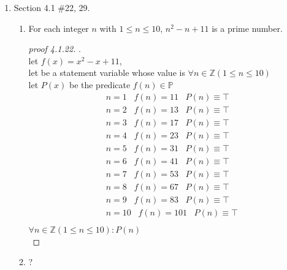 \documentclass[12pt]{article}
\newcommand{\T}[0]{\top}
\newcommand{\Z}{\mathbb{Z}}
\newcommand{\paren}[1]{\left( #1 \right)}
\begin{document}
\begin{enumerate}
        \item Section 4.1 \#22, 29.
            \begin{enumerate}
                \item[22.] For each integer $n$ with $1\leq n \leq 10$, $n^2 - n + 11$ is a prime number. 
                \begin{proof}[proof 4.1.22].\\
                    let $f(x) = x^2 - x + 11 $, \\
                    let be a statement variable whose value is $\forall n \in \Z \paren{1\leq n \leq 10}$\\
                    let $P(x)$ be the predicate $f(n) \in \mathbb{P}$\\
                    \begin{align*}
                        &n = 1\;\;\; f(n) = 11 \;\;\; P(n) \equiv \T\\
                        &n = 2\;\;\; f(n) = 13 \;\;\; P(n) \equiv \T\\
                        &n = 3\;\;\; f(n) = 17 \;\;\; P(n) \equiv \T\\
                        &n = 4\;\;\; f(n) = 23 \;\;\; P(n) \equiv \T\\
                        &n = 5\;\;\; f(n) = 31 \;\;\; P(n) \equiv \T\\
                        &n = 6\;\;\; f(n) = 41 \;\;\; P(n) \equiv \T\\
                        &n = 7\;\;\; f(n) = 53 \;\;\; P(n) \equiv \T\\
                        &n = 8\;\;\; f(n) = 67 \;\;\; P(n) \equiv \T\\
                        &n = 9\;\;\; f(n) = 83 \;\;\; P(n) \equiv \T\\
                        &n = 10\;\;\; f(n) = 101 \;\;\; P(n) \equiv \T\\
                    \end{align*}
                    $\forall n \in \Z \paren{1\leq n \leq 10}:P(n)$\\
                \end{proof}

                \item[29.]?
                
            \end{enumerate}


\end{enumerate}
\end{document}
